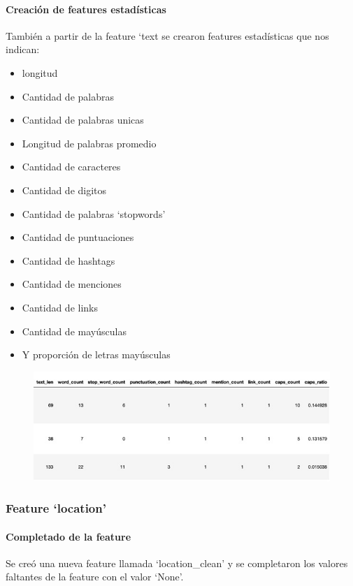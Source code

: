 \documentclass[12pt]{article}
\begin{document}
\paragraph{Creación de features estadísticas\\}
\newline También a partir de la feature ‘text se crearon features estadísticas que nos indican:
\begin{itemize}
  \item longitud
  \item Cantidad de palabras
  \item Cantidad de palabras unicas
  \item Longitud de palabras promedio
  \item Cantidad de caracteres
  \item Cantidad de digitos
  \item Cantidad de palabras ‘stopwords’
  \item Cantidad de puntuaciones
  \item Cantidad de hashtags
  \item Cantidad de menciones
  \item Cantidad de links
  \item Cantidad de mayúsculas
  \item Y proporción de letras mayúsculas
\end{itemize}

\begin{figure}[H]
    \centering
    \includegraphics[scale = 0.9]{imgs/table_2.jpg}
    \label{tp:fig:location}
\end{figure}


\subsubsection{Feature ‘location’}
\paragraph{Completado de la feature\\}
\newline Se creó una nueva feature llamada ‘location\_clean’ y se completaron los valores faltantes de la feature con el valor ‘None’.
\end{document}
